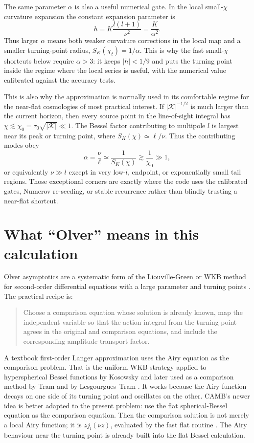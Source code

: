 \documentclass[11pt,a4paper]{article}
\newcommand{\code}[1]{\texttt{\detokenize{#1}}}
\newcommand{\SK}{S_K}
\newcommand{\abs}[1]{\left|#1\right|}
\begin{document}
The same parameter \(\alpha\) is also a useful numerical gate.  In the local
small-\(\chi\) curvature expansion the constant expansion parameter is
\begin{equation}
  h=K\frac{l(l+1)}{\nu^2}=\frac{K}{\alpha^2}.
\end{equation}
Thus larger \(\alpha\) means both weaker curvature corrections in the local map
and a smaller turning-point radius, \(\SK(\chi_t)=1/\alpha\).  This is why the
fast small-\(\chi\) shortcuts below require \(\alpha>3\): it keeps
\(\abs{h}<1/9\) and puts the turning point inside the regime where the local
series is useful, with the numerical value calibrated against the accuracy
tests.

This is also why the approximation is normally used in its comfortable regime
for the near-flat cosmologies of most practical interest.  If
\(\abs{\mathcal K}^{-1/2}\) is much larger than the current horizon, then every
source point in the line-of-sight integral has
\(\chi\lesssim \chi_0=\tau_0\sqrt{\abs{\mathcal K}}\ll1\).  The Bessel factor
contributing to multipole \(l\) is largest near its peak or turning point, where
\(\SK(\chi)\simeq \ell/\nu\).  Thus the contributing modes obey
\begin{equation}
  \alpha=\frac{\nu}{\ell}\simeq \frac{1}{\SK(\chi)}
  \gtrsim \frac{1}{\chi_0}\gg1,
\end{equation}
or equivalently \(\nu\gg l\) except in very low-\(l\), endpoint, or exponentially
small tail regions.  Those exceptional corners are exactly where the code uses
the calibrated gates, Numerov re-seeding, or stable recurrence rather than
blindly trusting a near-flat shortcut.

\section{What ``Olver'' means in this calculation}

Olver asymptotics are a systematic form of the Liouville-Green or WKB method for second-order differential equations with a large parameter and turning points \cite{olver}.  The practical recipe is:
\begin{quote}
Choose a comparison equation whose solution is already known, map the independent variable so that the action integral from the turning point agrees in the original and comparison equations, and include the corresponding amplitude transport factor.
\end{quote}
A textbook first-order Langer approximation uses the Airy equation as the comparison problem.  That is the uniform WKB strategy applied to hyperspherical Bessel functions by Kosowsky and later used as a comparison method by Tram and by Lesgourgues--Tram \cite{kosowsky1998,tram2013,lesgourgues-tram2013}.  It works because the Airy function decays on one side of its turning point and oscillates on the other.  CAMB's newer idea is better adapted to the present problem: use the flat spherical-Bessel equation as the comparison equation.  Then the comparison solution is not merely a local Airy function; it is \(zj_l(\nu z)\), evaluated by the fast flat routine \code{BJL}.  The Airy behaviour near the turning point is already built into the flat Bessel calculation.
\end{document}
